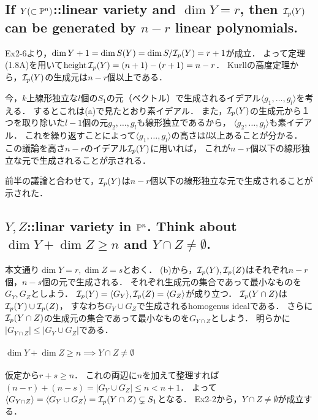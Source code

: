 \documentclass[a4paper]{jarticle}
\begin{document}
    \subsection{If $Y(\subset \mathbb{P}^n)$::linear variety and $\dim Y=r$, then $\mathcal{I}_p(Y)$ can be generated by $n-r$ linear polynomials.}
    Ex2-6より，$\dim Y+1=\dim S(Y)=\dim S/\mathcal{I}_p(Y)=r+1$が成立．
    よって定理(1.8A)を用いて$\operatorname{height} \mathcal{I}_p(Y)=(n+1)-(r+1)=n-r$．
    Kurllの高度定理から，$\mathcal{I}_p(Y)$の生成元は$n-r$個以上である．

    今，$k$上線形独立な$l$個の$S_1$の元（ベクトル）で生成されるイデアル$\langle g_1, \dots, g_l \rangle$を考える．
    するとこれは(a)で見たとおり素イデアル．
    また，$\mathcal{I}_p(Y)$の生成元から１つを取り除いた$l-1$個の元$g_2, \dots, g_l$も線形独立であるから，
    $\langle g_2, \dots, g_l \rangle$も素イデアル．
    これを繰り返すことによって$\langle g_1, \dots, g_l \rangle$の高さは$l$以上あることが分かる．
    この議論を高さ$n-r$のイデアル$\mathcal{I}_p(Y)$に用いれば，
    これが$n-r$個以下の線形独立な元で生成されることが示される．

    前半の議論と合わせて，$\mathcal{I}_p(Y)$は$n-r$個以下の線形独立な元で生成されることが示された．

    \subsection{$Y, Z$::linar variety in $\mathbb{P}^n$. Think about $\dim Y+\dim Z \geq n$ and $Y \cap Z \neq \emptyset$.}
    本文通り$\dim Y=r, \dim Z=s$とおく．
    (b)から，$\mathcal{I}_p(Y), \mathcal{I}_p(Z)$はそれぞれ$n-r$個，$n-s$個の元で生成される．
    それぞれ生成元の集合であって最小なものを$G_Y, G_Z$としよう．
    $\mathcal{I}_p(Y)=\langle G_Y \rangle, \mathcal{I}_p(Z)=\langle G_Z \rangle$が成り立つ．
    $\mathcal{I}_p(Y \cap Z)$は$\mathcal{I}_p(Y) \cup \mathcal{I}_p(Z)$，
    すなわち$G_Y \cup G_Z$で生成されるhomogenus idealである．
    さらに$\mathcal{I}_p(Y \cap Z)$の生成元の集合であって最小なものを$G_{Y \cap Z}$としよう．
    明らかに$|G_{Y \cap Z}| \leq |G_Y \cup G_Z|$である．

    \paragraph{$\dim Y+\dim Z \geq n \implies Y \cap Z \neq \emptyset$}
    仮定から$r+s \geq n$．
    これの両辺に$n$を加えて整理すれば$(n-r)+(n-s)=|G_Y \cup G_Z| \leq n < n+1$．
    よって$\langle G_{Y \cap Z} \rangle=\langle G_Y \cup G_Z \rangle=\mathcal{I}_p(Y \cap Z) \subsetneq S_1$となる．
    Ex2-2から，$Y \cap Z \neq \emptyset$が成立する．
\end{document}
